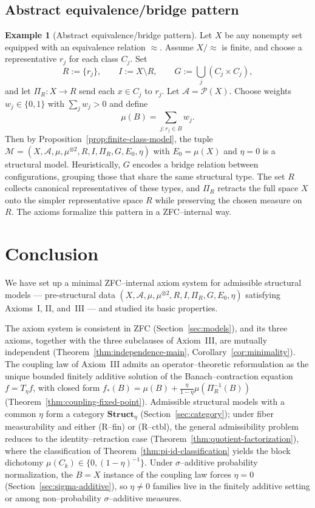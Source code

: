 \documentclass[11pt]{article}
\numberwithin{equation}{section}
\theoremstyle{definition}
\newtheorem{example}[theorem]{Example}
\begin{document}
\subsection{Abstract equivalence/bridge pattern}
\begin{example}[Abstract equivalence/bridge pattern]
\sloppy
Let $X$ be any nonempty set equipped with an equivalence relation $\approx$.
Assume $X/\!\approx$ is finite, and choose a representative $r_j$ for each class $C_j$.
Set
\[
R := \{r_j\},\qquad I := X\setminus R,\qquad
G := \bigcup_j (C_j\times C_j),
\]
and let $\Pi_R:X\to R$ send each $x\in C_j$ to $r_j$.
Let $\mathcal A=\mathcal P(X)$.
Choose weights $w_j\in\{0,1\}$ with $\sum_j w_j>0$ and define
\[
\mu(B) = \sum_{j : r_j\in B} w_j.
\]
Then by Proposition~\ref{prop:finite-class-model}, the tuple
$\mathcal M=(X,\mathcal A,\mu,\mu^{\otimes2},R,I,\Pi_R,G,E_0,\eta)$ with $E_0=\mu(X)$ and $\eta=0$
is a structural model.
Heuristically, $G$ encodes a bridge relation between configurations, grouping those
that share the same structural type.
The set $R$ collects canonical representatives of these types, and $\Pi_R$ retracts the
full space $X$ onto the simpler representative space $R$ while preserving the chosen
measure on $R$.
The axioms formalize this pattern in a ZFC--internal way.
\end{example}
\section{Conclusion}

We have set up a minimal ZFC--internal axiom system for admissible structural models — pre-structural data $(X,\mathcal A,\mu,\mu^{\otimes2},R,I,\Pi_R,G,E_0,\eta)$ satisfying Axioms~I, II, and~III — and studied its basic properties.

The axiom system is consistent in ZFC (Section~\ref{sec:models}), and its three axioms, together with the three subclauses of Axiom~III, are mutually independent (Theorem~\ref{thm:independence-main}, Corollary~\ref{cor:minimality}). The coupling law of Axiom~III admits an operator--theoretic reformulation as the unique bounded finitely additive solution of the Banach--contraction equation $f=T_\eta f$, with closed form $f_*(B)=\mu(B)+\tfrac{\eta}{1-\eta}\mu(\Pi_R^{-1}(B))$ (Theorem~\ref{thm:coupling-fixed-point}). Admissible structural models with a common $\eta$ form a category $\mathbf{Struct}_\eta$ (Section~\ref{sec:category}); under fiber measurability and either (R--fin) or (R--ctbl), the general admissibility problem reduces to the identity--retraction case (Theorem~\ref{thm:quotient-factorization}), where the classification of Theorem~\ref{thm:pi-id-classification} yields the block dichotomy $\mu(C_k)\in\{0,(1-\eta)^{-1}\}$. Under $\sigma$--additive probability normalization, the $B=X$ instance of the coupling law forces $\eta=0$ (Section~\ref{sec:sigma-additive}), so $\eta\neq 0$ families live in the finitely additive setting or among non--probability $\sigma$--additive measures.
\end{document}
